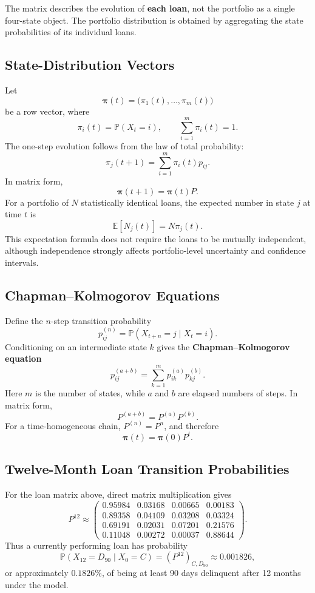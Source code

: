 \documentclass[12pt,openany]{book}
\theoremstyle{definition}
\theoremstyle{remark}
\begin{document}
The matrix describes the evolution of \textbf{each loan}, not the portfolio
as a single four-state object. The portfolio distribution is obtained by
aggregating the state probabilities of its individual loans.

\subsection{State-Distribution Vectors}

Let
\[
\boldsymbol{\pi}(t)
=\bigl(\pi_1(t),\ldots,\pi_m(t)\bigr)
\]
be a row vector, where
\[
\pi_i(t)=\mathbb{P}(X_t=i),
\qquad
\sum_{i=1}^{m}\pi_i(t)=1.
\]
The one-step evolution follows from the law of total probability:
\[
\pi_j(t+1)
=\sum_{i=1}^{m}\pi_i(t)p_{ij}.
\]
In matrix form,
\[
\boxed{
\boldsymbol{\pi}(t+1)=\boldsymbol{\pi}(t)P
}.
\]
For a portfolio of \(N\) statistically identical loans, the expected number
in state \(j\) at time \(t\) is
\[
\mathbb{E}[N_j(t)]=N\pi_j(t).
\]
This expectation formula does not require the loans to be mutually
independent, although independence strongly affects portfolio-level
uncertainty and confidence intervals.

\subsection{Chapman--Kolmogorov Equations}

Define the \(n\)-step transition probability
\[
p_{ij}^{(n)}
=\mathbb{P}(X_{t+n}=j\mid X_t=i).
\]
Conditioning on an intermediate state \(k\) gives the
\textbf{Chapman--Kolmogorov equation}
\[
\boxed{
p_{ij}^{(a+b)}
=\sum_{k=1}^{m}p_{ik}^{(a)}p_{kj}^{(b)}
}.
\]
Here \(m\) is the number of states, while \(a\) and \(b\) are elapsed numbers
of steps. In matrix form,
\[
P^{(a+b)}=P^{(a)}P^{(b)}.
\]
For a time-homogeneous chain, \(P^{(n)}=P^n\), and therefore
\[
\boldsymbol{\pi}(t)=\boldsymbol{\pi}(0)P^t.
\]

\subsection{Twelve-Month Loan Transition Probabilities}

For the loan matrix above, direct matrix multiplication gives
\[
P^{12}\approx
\begin{pmatrix}
0.95984&0.03168&0.00665&0.00183\\
0.89358&0.04109&0.03208&0.03324\\
0.69191&0.02031&0.07201&0.21576\\
0.11048&0.00272&0.00037&0.88644
\end{pmatrix}.
\]
Thus a currently performing loan has probability
\[
\mathbb{P}(X_{12}=D_{90}\mid X_0=C)
=(P^{12})_{C,D_{90}}
\approx0.001826,
\]
or approximately \(0.1826\%\), of being at least 90 days delinquent after
12 months under the model.
\end{document}
